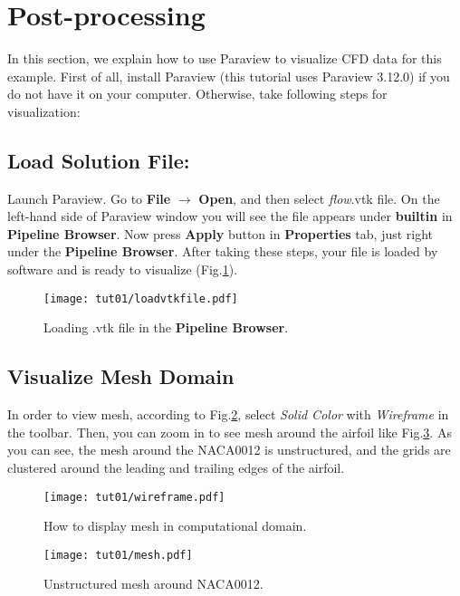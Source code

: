 \section{Post-processing}
In this section, we explain how to use Paraview to visualize CFD data for this example. First of all, install Paraview (this tutorial uses Paraview 3.12.0) if you do not have it on your computer. Otherwise, take following steps for visualization:
\subsection{Load Solution File:}
Launch Paraview. Go to \textbf{File} $\rightarrow$ \textbf{Open}, and then select \textit{flow}.vtk file. On the left-hand side of Paraview window you will see the file appears under \textbf{builtin} in \textbf{Pipeline Browser}. Now press \textbf{Apply} button in \textbf{Properties} tab, just right under the  \textbf{Pipeline Browser}. After taking these steps, your file is loaded by software and is ready to visualize (Fig.\ref{fig1:load}).
\begin{figure}[htbp]
    \centering
    \texttt{[image: tut01/loadvtkfile.pdf]}
    \caption{Loading .vtk file in the \textbf{Pipeline Browser}.}
    \label{fig1:load}
\end{figure}
\subsection{Visualize Mesh Domain}
In order to view mesh, according to Fig.\ref{fig1:wireframe}, select \textit{Solid Color} with \textit{Wireframe} in the toolbar. Then, you can zoom in to see mesh around the airfoil like Fig.\ref{fig1:mesh}. As you can see, the mesh around the NACA0012 is unstructured, and the grids are clustered around the leading and trailing edges of the airfoil.
\begin{figure}[htbp]
    \centering
    \texttt{[image: tut01/wireframe.pdf]}
    \caption{How to display mesh in computational domain.}
    \label{fig1:wireframe}
\end{figure}
\begin{figure}[htbp]
    \centering
    \texttt{[image: tut01/mesh.pdf]}
    \caption{Unstructured mesh around NACA0012.}
    \label{fig1:mesh}
\end{figure}
